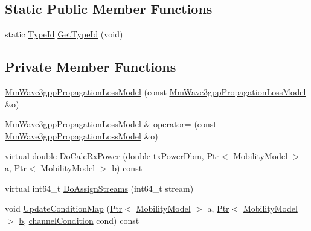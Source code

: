 \subsection*{Static Public Member Functions}
\begin{DoxyCompactItemize}
\item 
static \hyperlink{classns3_1_1TypeId}{Type\+Id} \hyperlink{classMmWave3gppPropagationLossModel_a1a8589a60905d335ac0d21da030c36fa}{Get\+Type\+Id} (void)
\end{DoxyCompactItemize}
\subsection*{Private Member Functions}
\begin{DoxyCompactItemize}
\item 
\hyperlink{classMmWave3gppPropagationLossModel_acb92e7979a8623363836b25569787598}{Mm\+Wave3gpp\+Propagation\+Loss\+Model} (const \hyperlink{classMmWave3gppPropagationLossModel}{Mm\+Wave3gpp\+Propagation\+Loss\+Model} \&o)
\item 
\hyperlink{classMmWave3gppPropagationLossModel}{Mm\+Wave3gpp\+Propagation\+Loss\+Model} \& \hyperlink{classMmWave3gppPropagationLossModel_aacd58ca47645b4fcccd4573b359c9655}{operator=} (const \hyperlink{classMmWave3gppPropagationLossModel}{Mm\+Wave3gpp\+Propagation\+Loss\+Model} \&o)
\item 
virtual double \hyperlink{classMmWave3gppPropagationLossModel_a7dd70e11f63fe41504f7954240c184a4}{Do\+Calc\+Rx\+Power} (double tx\+Power\+Dbm, \hyperlink{classns3_1_1Ptr}{Ptr}$<$ \hyperlink{classns3_1_1MobilityModel}{Mobility\+Model} $>$ a, \hyperlink{classns3_1_1Ptr}{Ptr}$<$ \hyperlink{classns3_1_1MobilityModel}{Mobility\+Model} $>$ \hyperlink{lte__pathloss_8m_a21ad0bd836b90d08f4cf640b4c298e7c}{b}) const 
\item 
virtual int64\+\_\+t \hyperlink{classMmWave3gppPropagationLossModel_aff84f9c1916e003f8624f22b35ef9354}{Do\+Assign\+Streams} (int64\+\_\+t stream)
\item 
void \hyperlink{classMmWave3gppPropagationLossModel_afe6cc723227bc7bb2f6b8cfd1cd08e6a}{Update\+Condition\+Map} (\hyperlink{classns3_1_1Ptr}{Ptr}$<$ \hyperlink{classns3_1_1MobilityModel}{Mobility\+Model} $>$ a, \hyperlink{classns3_1_1Ptr}{Ptr}$<$ \hyperlink{classns3_1_1MobilityModel}{Mobility\+Model} $>$ \hyperlink{lte__pathloss_8m_a21ad0bd836b90d08f4cf640b4c298e7c}{b}, \hyperlink{structchannelCondition}{channel\+Condition} cond) const 
\end{DoxyCompactItemize}
